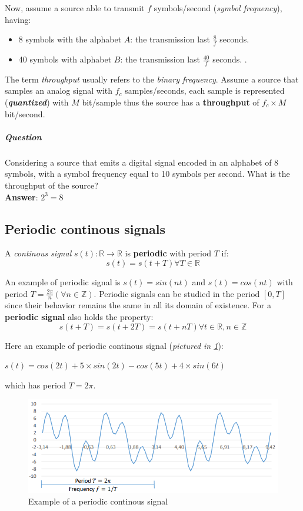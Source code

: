 \documentclass[10pt,a4paper]{report}
\theoremstyle{definition}
\begin{document}
Now, assume a source able to transmit $f$ symbols/second (\textit{symbol frequency}), having:
\begin{itemize}
	\item 
	8 symbols with the alphabet $A$: the transmission last $\frac{8}{f}$ seconds.
	\item 
	40 symbols with alphabet $B$: the transmission last $\frac{40}{f}$ seconds.
	.
\end{itemize}
The term \textit{throughput} usually refers to the \textit{binary frequency}. Assume a source that samples an analog signal with $f_{c}$ samples/seconds, each sample is represented (\textit{\textbf{quantized}}) with $M$ bit/sample thus the source has a \textbf{throughput} of $f_{c}\times M$ bit/second.
\subparagraph{Question}\label{sec:question}
Considering a source that emits a digital signal encoded in an alphabet of 8 symbols, with a symbol frequency equal to 10 symbols per second. What is the throughput of the source?\\
\textbf{Answer}: $2^{3} = 8$
\subsection{Periodic continous signals}\label{sec:periodic-continous-signals}
A \textit{continous signal} $s(t):\mathbb{R} \rightarrow \mathbb{R}$ is \textbf{periodic} with period $T$ if:
\begin{equation}
	s(t) = s(t + T)   \forall T \in \mathbb{R}
\end{equation}

An example of periodic signal is $s(t) = sin(nt)$ and $s(t)=cos(nt)$ with period $T = \frac{2\pi}{n} (\forall n \in \mathbb{Z})$.
Periodic signals can be studied in the period $[0,T]$ since their behavior remains the same in all its domain of existence. For a \textbf{periodic signal} also holds the property:
\begin{equation}
s(t+T) = s(t+2T) = s(t+nT)     \forall t \in \mathbb{R}, n \in \mathbb{Z}
\end{equation}

Here an example of periodic continous signal (\textit{pictured in \ref{periodic-signal-eg1}}):
\begin{center}
$s(t)= cos(2t) + 5 \times sin(2t) - cos(5t) +4 \times sin(6t)$
\end{center}
which has period $T = 2\pi$.
\begin{figure}[h]
	\centering\includegraphics[scale=0.50]{images/Pasted image 20230505114537.png}
	\caption{Example of a periodic continous signal}
	\label{periodic-signal-eg1}
\end{figure}
\end{document}
